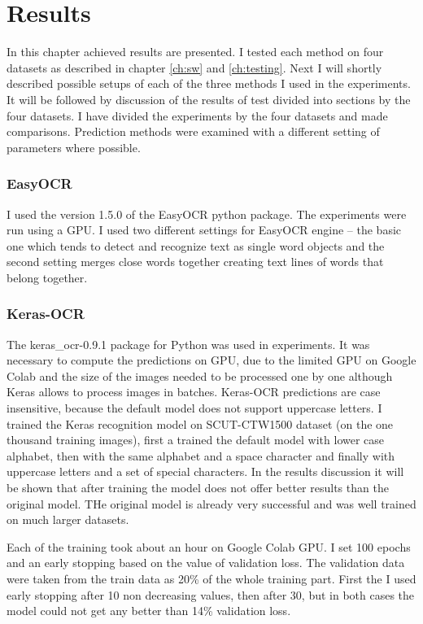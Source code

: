 \chapter{Results}
\label{ch:results}
In this chapter achieved results are presented. I tested each method on four datasets as described in chapter \ref{ch:sw} and \ref{ch:testing}. Next I will shortly described possible setups of each of the three methods I used in the experiments. It will be  followed by discussion of the results of test divided into sections by the four datasets.
I have divided the experiments by the four datasets and made comparisons. Prediction methods were examined with a different setting of parameters where possible.


\subsection*{EasyOCR}
I used the version 1.5.0 of the EasyOCR python package. The experiments were run using a GPU. I used two different settings for EasyOCR engine -- the basic one which tends to detect and recognize text as single word objects and the second setting merges close words together creating text lines of words that belong together.

\subsection*{Keras-OCR}
The keras\_ocr-0.9.1 package for Python was used in experiments. It was necessary to compute the predictions on GPU, due to the limited GPU on Google Colab and the size of the images needed to be processed one by one although Keras allows to process images in batches. Keras-OCR predictions are case insensitive, because the default model does not support uppercase letters. I trained the Keras recognition model on SCUT-CTW1500 dataset (on the one thousand training images), first a trained the default model with lower case alphabet, then with the same alphabet and a space character and finally with uppercase letters and a set of special characters. In the results discussion it will be shown that after training the model does not offer better results than the original model. THe original model is already very successful and was well trained on much larger datasets.

Each of the training took about an hour on Google Colab GPU. I set 100 epochs and an early stopping based on the value of validation loss. The validation data were taken from the train data as 20\% of the whole training part. First the I used early stopping after 10 non decreasing values, then after 30, but in both cases the model could not get any better than 14\% validation loss.


